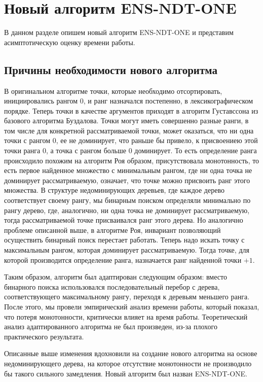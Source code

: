\section{Новый алгоритм ENS-NDT-ONE}

В данном разделе опишем новый алгоритм ENS-NDT-ONE и представим асимптотическую оценку времени работы.

\subsection{Причины необходимости нового алгоритма}

В оригинальном алгоритме точки, которые необходимо отсортировать, инициировались рангом $0$, и ранг назначался постепенно, в лексикографическом порядке. Теперь точки в качестве аргументов приходят в алгоритм Густавссона из базового алгоритма Буздалова. Точки могут иметь совершенно разные ранги, в том числе для конкретной рассматриваемой точки, может оказаться, что ни одна точки с рангом $0$, ее не доминирует, что раньше бы привело, к присвоениею этой точки ранга $0$, а точка с рангом больше $0$ доминирует. То есть определение ранга происходило похожим на алгоритм Роя образом, присутствовала монотонность, то есть первое найденное множество с минимальным рангом, где ни одна точка не доминирует рассматриваемую, означает, что точке можно присвоить ранг этого множества. В структуре недоминирующих деревьев, где каждое дерево соответствует своему рангу, мы бинарным поиском определяли минимально по рангу дерево, где, аналогично, ни одна точка не доминирует рассматриваемую, тогда рассматриваемой точке присваивался ранг этого дерева. Но аналогично проблеме описанной выше, в алгоритме Роя, инвариант позволяющий осуществить бинарный поиск перестает работать. Теперь надо искать точку с максимальным рангом, которая доминирует рассматриваемую. Тогда точке, для которой производится определение ранга, назначается ранг найденной точки $+ 1$.  

Таким образом, алгоритм был адаптирован следующим образом: вместо бинарного поиска использовался последовательный перебор с дерева, соответствующего максимальному рангу, переходя к деревьям меньшего ранга. После этого, мы провели эмпирический анализ времени работы, который показал, что потеря монотонности, критически влияет на время работы. Теоретический анализ адаптированного алгоритма не был произведен, из-за плохого практического результата.

Описанные выше изменения вдохновили на создание нового алгоритма на основе недоминирующего дерева, на которое отсутствие монотонности не производило бы такого сильного замедления. Новый алгоритм был назван ENS-NDT-ONE.

